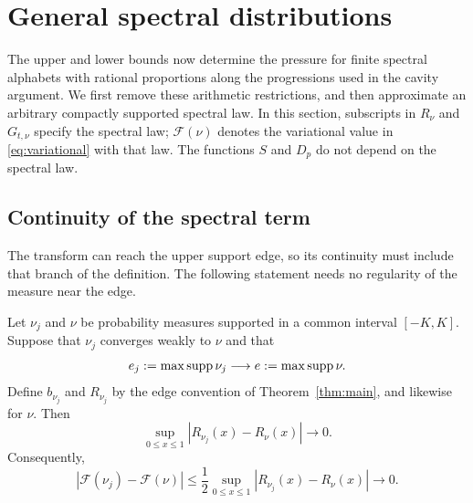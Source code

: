 \section{General spectral distributions}\label{sec:general}

The upper and lower bounds now determine the pressure for finite spectral
alphabets with rational proportions along the progressions used in the
cavity argument.  We first remove these arithmetic restrictions, and then
approximate an arbitrary compactly supported spectral law.  In this
section, subscripts in $R_\nu$ and $G_{t,\nu}$ specify the spectral law;
$\mathcal F(\nu)$ denotes the variational value in
\eqref{eq:variational} with that law.  The functions $S$ and $D_p$ do not
depend on the spectral law.

\subsection{Continuity of the spectral term}

The transform can reach the upper support edge, so its continuity must
include that branch of the definition.  The following statement needs
no regularity of the measure near the edge.

\begin{lemma}\label{gen:R-continuity}
Let $\nu_j$ and $\nu$ be probability measures supported in a common
interval $[-K,K]$.  Suppose that $\nu_j$ converges weakly to $\nu$ and
that
\[
 e_j:=\max\operatorname{supp}\nu_j\longrightarrow e:=\max\operatorname{supp}\nu.
\]
Define $b_{\nu_j}$ and $R_{\nu_j}$ by the edge convention of
Theorem~\ref{thm:main}, and likewise for $\nu$.  Then
\begin{equation}\label{gen:R-uniform}
 \sup_{0\le x\le1}|R_{\nu_j}(x)-R_\nu(x)|\longrightarrow0.
\end{equation}
Consequently,
\begin{equation}\label{gen:variational-continuity}
 |\mathcal F(\nu_j)-\mathcal F(\nu)|
 \le \frac12\sup_{0\le x\le1}|R_{\nu_j}(x)-R_\nu(x)|
 \longrightarrow0.
\end{equation}
\end{lemma}

